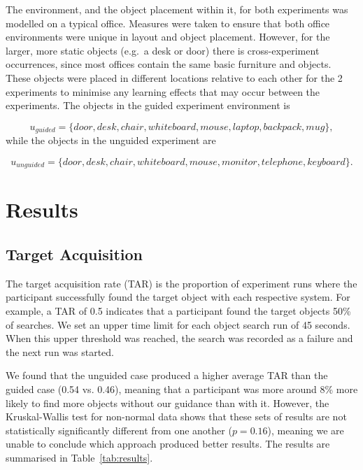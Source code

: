 \documentclass[runningheads]{llncs}
\begin{document}
The environment, and the object placement within it, for both experiments was modelled on a typical office.
Measures were taken to ensure that both office environments were unique in layout and object placement. 
However, for the larger, more static objects (e.g.\ a desk or door) there is cross-experiment occurrences, since most offices contain the same basic furniture and objects. 
These objects were placed in different locations relative to each other for the 2 experiments to minimise any learning effects that may occur between the experiments. 
The objects in the guided experiment environment is

\begin{equation}
  u_{guided} = \{ door, desk, chair, whiteboard, mouse, laptop, backpack, mug \},
\end{equation}
while the objects in the unguided experiment are

\begin{equation}
  u_{unguided} = \{ door, desk, chair, whiteboard, mouse, monitor, telephone, keyboard \}.
\end{equation}


\section{Results}\label{sec:results}

\subsection{Target Acquisition}

The target acquisition rate (TAR) is the proportion of experiment runs where the participant successfully found the target object with each respective system. 
For example, a TAR of 0.5 indicates that a participant found the target objects 50\% of searches. 
We set an upper time limit for each object search run of 45 seconds.
When this upper threshold was reached, the search was recorded as a failure and the next run was started. 

We found that the unguided case produced a higher average TAR than the guided case (0.54 vs. 0.46), meaning that a participant was more around 8\% more likely to find more objects without our guidance than with it.
However, the Kruskal-Wallis test for non-normal data shows that these sets of results are not statistically significantly different from one another ($p = 0.16$), meaning we are unable to conclude which approach produced better results. 
The results are summarised in Table~\ref{tab:results}. 
\end{document}
